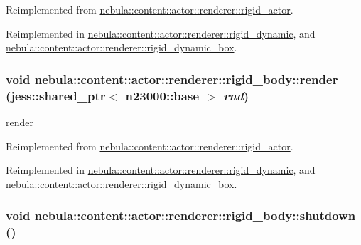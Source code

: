 Reimplemented from \hyperlink{classnebula_1_1content_1_1actor_1_1renderer_1_1rigid__actor_a595700dbe653ae7c64b01ad332065725}{nebula::content::actor::renderer::rigid\_\-actor}.

Reimplemented in \hyperlink{classnebula_1_1content_1_1actor_1_1renderer_1_1rigid__dynamic_ae90eb12e9f68833bd1bf0b8360332f49}{nebula::content::actor::renderer::rigid\_\-dynamic}, and \hyperlink{classnebula_1_1content_1_1actor_1_1renderer_1_1rigid__dynamic__box_a26efbc775da4307f9294dab260b43723}{nebula::content::actor::renderer::rigid\_\-dynamic\_\-box}.\hypertarget{classnebula_1_1content_1_1actor_1_1renderer_1_1rigid__body_ae3a3c72c7306b9ee55eb75abf36e7476}{
\subsubsection[{render}]{\setlength{\rightskip}{0pt plus 5cm}void nebula::content::actor::renderer::rigid\_\-body::render (jess::shared\_\-ptr$<$ {\bf n23000::base} $>$ {\em rnd})}}
\label{classnebula_1_1content_1_1actor_1_1renderer_1_1rigid__body_ae3a3c72c7306b9ee55eb75abf36e7476}


render 

Reimplemented from \hyperlink{classnebula_1_1content_1_1actor_1_1renderer_1_1rigid__actor_a099097e3dd6511e0ae3a25a9f092efcf}{nebula::content::actor::renderer::rigid\_\-actor}.

Reimplemented in \hyperlink{classnebula_1_1content_1_1actor_1_1renderer_1_1rigid__dynamic_a80f2984c2dadef15360b53cf3d05286c}{nebula::content::actor::renderer::rigid\_\-dynamic}, and \hyperlink{classnebula_1_1content_1_1actor_1_1renderer_1_1rigid__dynamic__box_af1ee2316e0a03674fbbaea64cf1c4a8b}{nebula::content::actor::renderer::rigid\_\-dynamic\_\-box}.\hypertarget{classnebula_1_1content_1_1actor_1_1renderer_1_1rigid__body_a24b3051c9db06008d8698cc97eff21e0}{
\subsubsection[{shutdown}]{\setlength{\rightskip}{0pt plus 5cm}void nebula::content::actor::renderer::rigid\_\-body::shutdown ()}}
\label{classnebula_1_1content_1_1actor_1_1renderer_1_1rigid__body_a24b3051c9db06008d8698cc97eff21e0}


